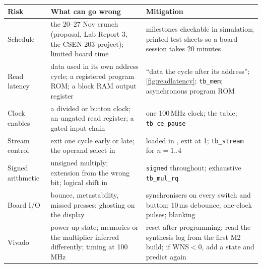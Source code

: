 \begin{center}\small
\begin{tabularx}{\linewidth}{@{}l L L@{}}
\toprule
Risk & What can go wrong & Mitigation \\
\midrule
Schedule & the 20--27 Nov crunch (proposal, Lab Report 3, the CSEN 203 project); limited board time & milestones checkable in simulation; printed test sheets so a board session takes 20 minutes \\
Read latency & data used in its own address cycle; a registered program ROM; a block RAM output register & ``data the cycle after its address''; \cref{fig:readlatency}; \texttt{tb\_mem}; asynchronous program ROM \\
Clock enables & a divided or button clock; an ungated read register; a gated input chain & one 100\,MHz clock; the  table; \texttt{tb\_ce\_pause} \\
Stream control & exit one cycle early or late; the operand select in  &  loaded in , exit at 1; \texttt{tb\_stream} for $n = 1..4$ \\
Signed arithmetic & unsigned multiply; extension from the wrong bit; logical shift in  & \texttt{signed} throughout; exhaustive \texttt{tb\_mul\_rq} \\
Board I/O & bounce, metastability, missed presses; ghosting on the display & synchronisers on every switch and button; 10\,ms debounce; one-clock pulses; blanking \\
Vivado & power-up state; memories or the multiplier inferred differently; timing at 100\,MHz & reset after programming; read the synthesis log from the first M2 build; if $\text{WNS} < 0$, add a state and predict again \\
\bottomrule
\end{tabularx}
\end{center}
